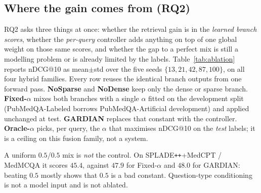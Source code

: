 \subsection{Where the gain comes from (RQ2)}
\label{sec:ablation}

RQ2 asks three things at once: whether the retrieval gain is in the
\emph{learned branch scores}, whether the \emph{per-query} controller adds
anything on top of one global weight on those same scores, and whether the
gap to a perfect mix is still a modelling problem or is already limited by
the labels. Table~\ref{tab:ablation} reports nDCG@10 as mean$\pm$std over the
five seeds $\{13,21,42,87,100\}$, on all four hybrid families. Every row
reuses the identical branch outputs from one forward pass. \textbf{NoSparse}
and \textbf{NoDense} keep only the dense or sparse branch.
\textbf{Fixed-$\alpha$} mixes both branches with a single $\alpha$ fitted on
the development split (PubMedQA-Labeled borrows PubMedQA-Artificial
development) and applied unchanged at test. \textbf{GARDIAN} replaces that
constant with the controller. \textbf{Oracle-$\alpha$} picks, per query, the
$\alpha$ that maximises nDCG@10 on the \emph{test} labels; it is a ceiling on
this fusion family, not a system.

A uniform $0.5$/$0.5$ mix is \emph{not} the control. On
SPLADE\texttt{++}+MedCPT / MedMCQA it scores $45.4$, against $47.9$ for
Fixed-$\alpha$ and $48.0$ for GARDIAN: beating $0.5$ mostly shows that $0.5$
is a bad constant. Question-type conditioning is not a model input and is
not ablated.


